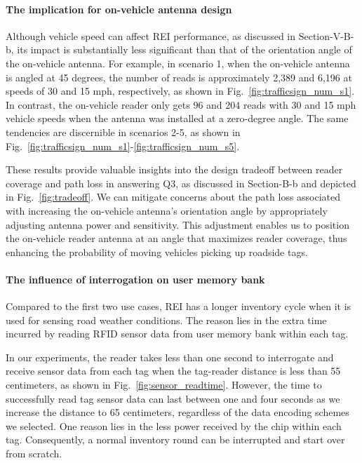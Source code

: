 \documentclass[lettersize,journal]{IEEEtran}
\begin{document}
\paragraph{The implication for on-vehicle antenna design}
Although vehicle speed can affect REI performance, as discussed in Section-V-B-b, its impact is substantially less significant than that of the orientation angle of the on-vehicle antenna. For example, in scenario 1, when the on-vehicle antenna is angled at 45 degrees, the number of reads is approximately 2,389 and 6,196 at speeds of 30 and 15 mph, respectively, as shown in Fig.~\ref{fig:trafficsign_num_s1}. In contrast, the on-vehicle reader only gets 96 and 204 reads with 30 and 15 mph vehicle speeds when the antenna was installed at a zero-degree angle. The same tendencies are discernible in scenarios 2-5, as shown in Fig.~\ref{fig:trafficsign_num_s1}-\ref{fig:trafficsign_num_s5}.

These results provide valuable insights into the design tradeoff between reader coverage and path loss in answering Q3, as discussed in Section-B-b and depicted in Fig.~\ref{fig:tradeoff}. We can mitigate concerns about the path loss associated with increasing the on-vehicle antenna's orientation angle by appropriately adjusting antenna power and sensitivity. This adjustment enables us to position the on-vehicle reader antenna at an angle that maximizes reader coverage, thus enhancing the probability of moving vehicles picking up roadside tags.

\paragraph{The influence of interrogation on user memory bank}
Compared to the first two use cases, REI has a longer inventory cycle when it is used for sensing road weather conditions. The reason lies in the extra time incurred by reading RFID sensor data from user memory bank within each tag.

In our experiments, the reader takes less than one second to interrogate and receive sensor data from each tag when the tag-reader distance is less than 55 centimeters, as shown in Fig.~\ref{fig:sensor_readtime}. However, the time to successfully read tag sensor data can last between one and four seconds as we increase the distance to 65 centimeters, regardless of the data encoding schemes we selected. One reason lies in the less power received by the chip within each tag. Consequently, a normal inventory round can be interrupted and start over from scratch.
\end{document}
